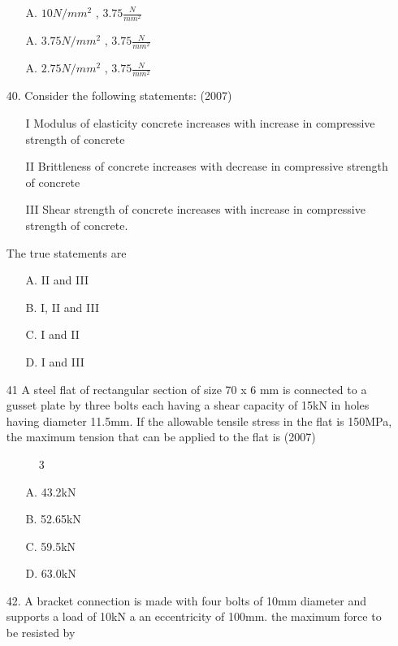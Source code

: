 \documentclass[journal]{IEEEtran}
\begin{document}
\begin{enumerate}
\begin{enumerate}
    \item [A.] $10N/mm^2$ , $3.75\frac{N}{mm^2}$
    \item [A.] $3.75N/mm^2$ , $3.75\frac{N}{mm^2}$ 
    \item [A.] $2.75N/mm^2$ , $3.75\frac{N}{mm^2}$ 
  \end{enumerate}
  \item[40.] Consider the following statements: \hfill (2007)
  \begin{enumerate}
    \item [I] Modulus of elasticity concrete increases with increase in compressive
    strength of concrete
    \item [II] Brittleness of concrete increases with decrease in compressive strength of
    concrete
    \item [III] Shear strength of concrete increases with increase in compressive strength
    of concrete. 
  \end{enumerate}
  The true statements are 
  \begin{enumerate}
    \item [A.] II and III
    \item [B.] I, II and III
    \item [C.] I and II
    \item [D.] I and III
  \end{enumerate}
  \item[41]  A steel flat of rectangular section of size 70 x 6 mm is connected to a gusset plate
  by three bolts each having a shear capacity of 15kN in holes having diameter
  11.5mm. If the allowable tensile stress in the flat is 150MPa, the maximum
  tension that can be applied to the flat is \hfill (2007)
  \begin{figure}[!ht]
    \centering
    \caption{3 }
    \label{3 }
  \end{figure}
  \begin{enumerate}
    \item [A.] 43.2kN
    \item [B.] 52.65kN
    \item [C.] 59.5kN
    \item [D.] 63.0kN
  \end{enumerate}
  \item[42.] A bracket connection is made with four bolts of 10mm diameter and supports a
  load of 10kN a an eccentricity of 100mm. the maximum force to be resisted by

\end{enumerate}
\end{document}
